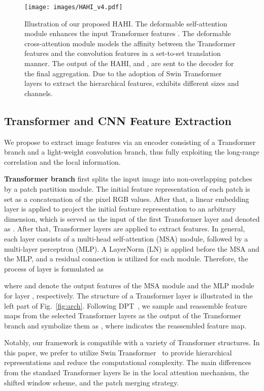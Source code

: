 \documentclass[twocolumn]{svjour3}    \pdfoutput=1
\begin{document}
\begin{figure*}[t]
    \centering
      \texttt{[image: images/HAHI\_v4.pdf]}
      \caption{Illustration of our proposed HAHI. The deformable self-attention module enhances the input Transformer features . The deformable cross-attention module models the affinity between the Transformer features  and the convolution features  in a set-to-set translation manner. The output of the HAHI,  and , are sent to the decoder for the final aggregation. Due to the adoption of Swin Transformer layers to extract the hierarchical features,  exhibits different sizes and channels.}
    \label{fig:HAHI}
\end{figure*}





\subsection{Transformer and CNN Feature Extraction}
\label{sec:subsec:FE}
We propose to extract image features via an encoder consisting of a Transformer branch and a light-weight convolution branch, thus fully exploiting the long-range correlation and the local information. 

\textbf{Transformer branch} first splits the input image  into non-overlapping patches by a patch partition module. The initial feature representation of each patch is set as a concatenation of the pixel RGB values. After that, a linear embedding layer is applied to project the initial feature representation to an arbitrary dimension, which is served as the input of the first Transformer layer and denoted as . After that,  Transformer layers are applied to extract features. In general, each layer consists of a multi-head self-attention (MSA) module, followed by a multi-layer perceptron (MLP). A LayerNorm (LN) is applied before the MSA and the MLP, and a residual connection is utilized for each module. Therefore, the process of layer  is formulated as

where  and  denote the output features of the MSA module and the MLP module for layer , respectively. The structure of a Transformer layer is illustrated in the left part of Fig.~\ref{fig:arch}.  Following DPT~\citep{ranftl2021dpt}, we sample and reassemble  feature maps from the  selected Transformer layers as the output of the Transformer branch and symbolize them as , where  indicates the  reassembled feature map.

Notably, our framework is compatible with a variety of Transformer structures. In this paper, we prefer to utilize Swin Transformer~\citep{liu2021swin} to provide hierarchical representations and reduce the computational complexity. The main differences from the standard Transformer layers lie in the local attention mechanism, the shifted window scheme, and the patch merging strategy.
\end{document}
